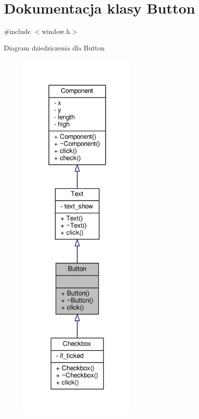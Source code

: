 \hypertarget{classButton}{}\section{Dokumentacja klasy Button}
\label{classButton}


{\ttfamily \#include $<$window.\+h$>$}



Diagram dziedziczenia dla Button
\nopagebreak
\begin{figure}[H]
\begin{center}
\leavevmode
\includegraphics[height=550pt]{classButton__inherit__graph}
\end{center}
\end{figure}


